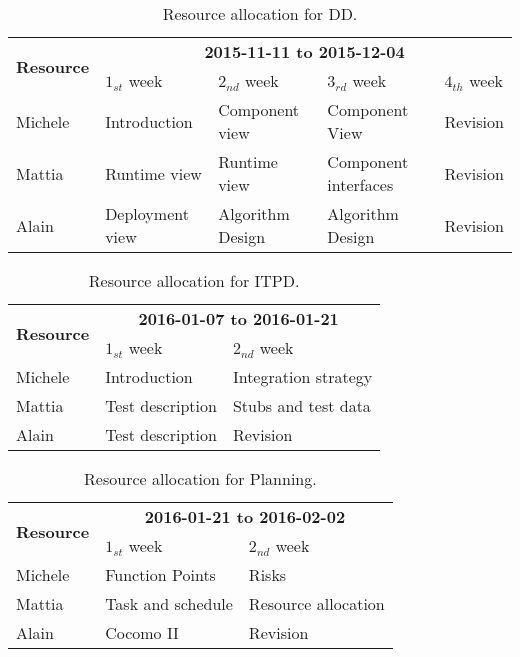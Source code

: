 \begin{table}
    \centering
    \begin{small}
    \begin{tabular}{| l | l | l | l | l |}
        \hline
        \multirow{2}{*}{\textbf{Resource}} & \multicolumn{4}{c|}{\textbf{2015-11-11 to 2015-12-04}} \\
        \cline{2-5}
        & $1_{st}$ week & $2_{nd}$ week & $3_{rd} $ week & $4_{th}$ week\\
        \hline
        Michele        & Introduction      & Component view     & Component View & Revision   \\
        Mattia         & Runtime view      & Runtime view       & Component interfaces & Revision   \\
        Alain          & Deployment view   & Algorithm Design   & Algorithm Design & Revision  \\
        \hline
    \end{tabular}
    \end{small}
    \caption{Resource allocation for DD.}
    \label{tab:dd-res-alloc}
\end{table}

\begin{table}
    \centering
    \begin{tabular}{| l | l | l |}
        \hline
        \multirow{2}{*}{\textbf{Resource}} & \multicolumn{2}{c|}{\textbf{2016-01-07 to 2016-01-21}} \\
        \cline{2-3}
        & $1_{st}$ week & $2_{nd}$ week \\
        \hline
        Michele        & Introduction        & Integration strategy       \\
        Mattia         & Test description    & Stubs and test data    \\
        Alain          & Test description    & Revision    \\
        \hline
    \end{tabular}
    \caption{Resource allocation for ITPD.}
    \label{tab:itpd-res-alloc}
\end{table}

\begin{table}
    \centering
    \begin{tabular}{| l | l | l |}
        \hline
        \multirow{2}{*}{\textbf{Resource}} & \multicolumn{2}{c|}{\textbf{2016-01-21 to 2016-02-02}} \\
        \cline{2-3}
        & $1_{st}$ week & $2_{nd}$ week \\
        \hline
        Michele        & Function Points       & Risks      \\
        Mattia         & Task and schedule     & Resource allocation    \\
        Alain          & Cocomo II             & Revision    \\
        \hline
    \end{tabular}
    \caption{Resource allocation for Planning.}
    \label{tab:plan-res-alloc}
\end{table}

